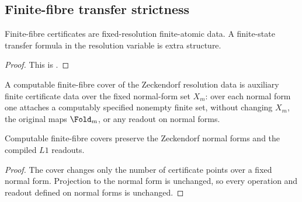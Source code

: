 \subsection{Finite-fibre transfer strictness}

\begin{proposition}
\label{prop:L2-generic-vs-structural}
Finite-fibre certificates are fixed-resolution finite-atomic data.  A
finite-state transfer formula in the resolution variable is extra structure.
\end{proposition}

\begin{proof}
This is .
\end{proof}

\begin{definition}
\label{def:computable-cover}
A computable finite-fibre cover of the Zeckendorf resolution data is auxiliary
finite certificate data over the fixed normal-form set \(X_m\): over each normal
form one attaches a computably specified nonempty finite set, without changing
\(X_m\), the original maps \(\Fold_m\), or any readout on normal forms.
\end{definition}

\begin{lemma}
\label{lem:cover-preserves-protocol}
Computable finite-fibre covers preserve the Zeckendorf normal forms and the
compiled \(L1\) readouts.
\end{lemma}

\begin{proof}
The cover changes only the number of certificate points over a fixed normal
form.  Projection to the normal form is unchanged, so every operation and
readout defined on normal forms is unchanged.
\end{proof}


